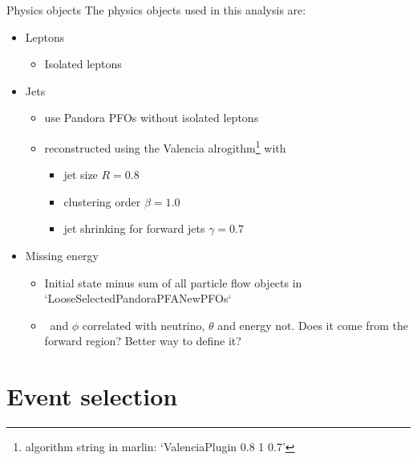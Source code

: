 \documentclass{beamer}
\begin{document}
\begin{frame}{Physics objects}
The physics objects used in this analysis are:
\begin{itemize}
  \item Leptons
  \begin{itemize}
    \item Isolated leptons
  \end{itemize}
  \item Jets
  \begin{itemize}
    \item use Pandora PFOs without isolated leptons
    \item reconstructed using the Valencia alrogithm\footnote{algorithm string in marlin: `ValenciaPlugin 0.8 1 0.7'} with
    \begin{itemize}
      \item jet size $R=0.8$
      \item clustering order $\beta=1.0$
      \item jet shrinking for forward jets $\gamma=0.7$
    \end{itemize}
  \end{itemize}
  \item Missing energy
  \begin{itemize}
    \item Initial state minus sum of all particle flow objects in `LooseSelectedPandoraPFANewPFOs`
    \item \pt\ and $\phi$ correlated with neutrino, $\theta$ and energy not. Does it come from the forward region? Better way to define it?
  \end{itemize}
\end{itemize}
\end{frame}










\section{Event selection}
\end{document}
